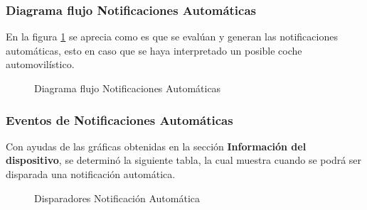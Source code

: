 \subsubsection{Diagrama flujo Notificaciones Automáticas}

En la figura \ref{fig:DiagramaNA} se aprecia como es que se evalúan y generan las notificaciones automáticas, esto en caso que se haya interpretado un posible coche automovilístico.


\begin{figure}[htbp!]
	\centering
	\caption{Diagrama flujo Notificaciones Automáticas}
	\label{fig:DiagramaNA}
\end{figure}

\subsubsection{Eventos de Notificaciones Automáticas}

Con ayudas de las gráficas obtenidas en la sección \textbf{Información del dispositivo}, se determinó la siguiente tabla, la cual muestra cuando se podrá ser disparada una notificación automática.

\begin{figure}[htbp!]
	\centering
	\caption{Disparadores Notificación Automática}
	\label{fig:Disparadores}
\end{figure}

